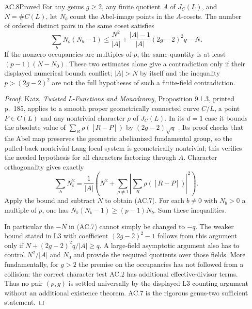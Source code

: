 \begin{claim}{AC.8}{Proved}
For any genus $g\ge2$, any finite quotient $A$ of $J_C(L)$, and
$N=\#C(L)$, let $N_b$ count the Abel-image points in the $A$-cosets.
The number of ordered distinct pairs in the same coset satisfies
\[
 \sum_b N_b(N_b-1)
 \le\frac{N^2}{|A|}
       +\frac{|A|-1}{|A|}(2g-2)^2q-N.                     \tag{AC.7}
\]
If the nonzero occupancies are multiples of $p$, the same quantity is
at least $(p-1)(N-N_0)$.  These two estimates alone give a contradiction
only if their displayed numerical bounds conflict; $|A|>N$ by itself
and the inequality $p>(2g-2)^2$ are not the full hypotheses of such a
finite-field contradiction.
\end{claim}
\begin{proof}
Katz, \emph{Twisted L-Functions and Monodromy}, Proposition 9.1.3,
printed p.~185, applies to a smooth proper geometrically connected curve
$C/L$, a point $P\in C(L)$ and any nontrivial character $\rho$ of
$J_C(L)$.  In its $d=1$ case it bounds the absolute value of
$\sum_R\rho([R-P])$ by $(2g-2)\sqrt q$ \cite{AC_Katz2002}.
Its proof checks that the Abel map preserves the geometric abelianized
fundamental group, so the pulled-back nontrivial Lang local system is
geometrically nontrivial; this verifies the needed hypothesis for all
characters factoring through $A$.
Character orthogonality gives exactly
\[
   \sum_bN_b^2=\frac1{|A|}\left(N^2+
             \sum_{\rho\ne1}|\sum_R\rho([R-P])|^2\right).
\]
Apply the bound and subtract $N$ to obtain (AC.7).  For each $b\ne0$
with $N_b>0$ a multiple of $p$, one has
$N_b(N_b-1)\ge(p-1)N_b$.  Sum these inequalities.

In particular the $-N$ in (AC.7) cannot simply be changed to $-q$.
The weaker bound stated in L3 with coefficient $(2g-2)^2-1$ follows
from this argument only if
$N+(2g-2)^2q/|A|\ge q$.  A large-field asymptotic argument also has to
control $N^2/|A|$ and $N_0$ and provide the required quotients over those
fields.  More fundamentally, for $g>2$ the premise on the occupancies
has not followed from a collision: the correct character test AC.2 has
additional effective-divisor terms.  Thus no pair $(p,g)$ is settled
universally by the displayed L3 counting argument without an additional
existence theorem.  AC.7 is the rigorous genus-two sufficient statement.
\end{proof}

